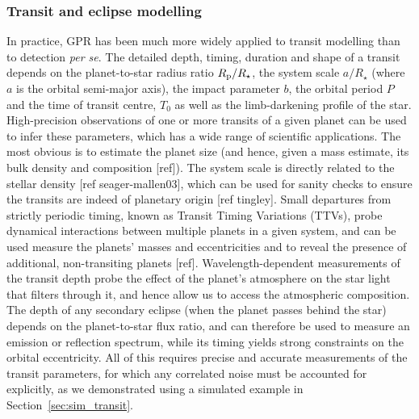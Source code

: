 \documentclass[letterpaper]{ar-1col}
\begin{document}
\subsubsection{Transit and eclipse modelling}

In practice, GPR has been much more widely applied to transit modelling than to detection \textit{per se}. The detailed depth, timing, duration and shape of a transit depends on the planet-to-star radius ratio $R_{\rm p}/R_\star$, the system scale $a/R_\star$ (where $a$ is the orbital semi-major axis), the impact parameter $b$, the orbital period $P$ and the time of transit centre, $T_0$ as well as the limb-darkening profile of the star. High-precision observations of one or more transits of a given planet can be used to infer these parameters, which has a wide range of scientific applications. The most obvious is to estimate the planet size (and hence, given a mass estimate, its bulk density and composition [ref]). The system scale is directly related to the stellar density [ref seager-mallen03], which can be used for sanity checks to ensure the transits are indeed of planetary origin [ref tingley]. Small departures from strictly periodic timing, known as Transit Timing Variations (TTVs), probe dynamical interactions between multiple planets in a given system, and can be used measure the planets' masses and eccentricities and to reveal the presence of additional, non-transiting planets [ref]. Wavelength-dependent measurements of the transit depth probe the effect of the planet's atmosphere on the star light that filters through it, and hence allow us to access the atmospheric composition. The depth of any secondary eclipse (when the planet passes behind the star) depends on the planet-to-star flux ratio, and can therefore be used to measure an emission or reflection spectrum, while its timing yields strong constraints on the orbital eccentricity. All of this requires precise and accurate measurements of the transit parameters, for which any correlated noise must be accounted for explicitly, as we demonstrated using a simulated example in Section~\ref{sec:sim_transit}. 
\end{document}
